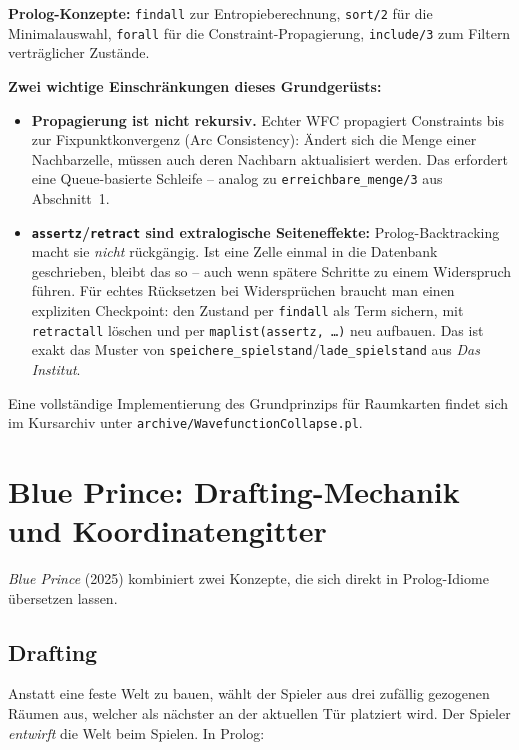 \documentclass[parskip=half,a4paper,11pt]{scrreprt}
\begin{document}
\textbf{Prolog-Konzepte:} \texttt{findall} zur Entropieberechnung, \texttt{sort/2} für die Minimalauswahl, \texttt{forall} für die Constraint-Propagierung, \texttt{include/3} zum Filtern verträglicher Zustände.

\textbf{Zwei wichtige Einschränkungen dieses Grundgerüsts:}
\begin{itemize}
    \item \textbf{Propagierung ist nicht rekursiv.} Echter WFC propagiert Constraints bis zur Fixpunktkonvergenz (Arc Consistency): Ändert sich die Menge einer Nachbarzelle, müssen auch deren Nachbarn aktualisiert werden. Das erfordert eine Queue-basierte Schleife -- analog zu \texttt{erreichbare\_menge/3} aus Abschnitt~1.
    \item \textbf{\texttt{assertz}/\texttt{retract} sind extralogische Seiteneffekte:} Prolog-Backtracking macht sie \textit{nicht} rückgängig. Ist eine Zelle einmal in die Datenbank geschrieben, bleibt das so -- auch wenn spätere Schritte zu einem Widerspruch führen. Für echtes Rücksetzen bei Widersprüchen braucht man einen expliziten Checkpoint: den Zustand per \texttt{findall} als Term sichern, mit \texttt{retractall} löschen und per \texttt{maplist(assertz,\,\ldots)} neu aufbauen. Das ist exakt das Muster von \texttt{speichere\_spielstand}/\texttt{lade\_spielstand} aus \textit{Das Institut}.
\end{itemize}

Eine vollständige Implementierung des Grundprinzips für Raumkarten findet sich im Kursarchiv unter \texttt{archive/WavefunctionCollapse.pl}.

\section{Blue Prince: Drafting-Mechanik und Koordinatengitter}

\textit{Blue Prince} (2025) kombiniert zwei Konzepte, die sich direkt in Prolog-Idiome übersetzen lassen.

\subsection*{Drafting}

Anstatt eine feste Welt zu bauen, wählt der Spieler aus drei zufällig gezogenen Räumen aus, welcher als nächster an der aktuellen Tür platziert wird. Der Spieler \textit{entwirft} die Welt beim Spielen. In Prolog:
\end{document}

